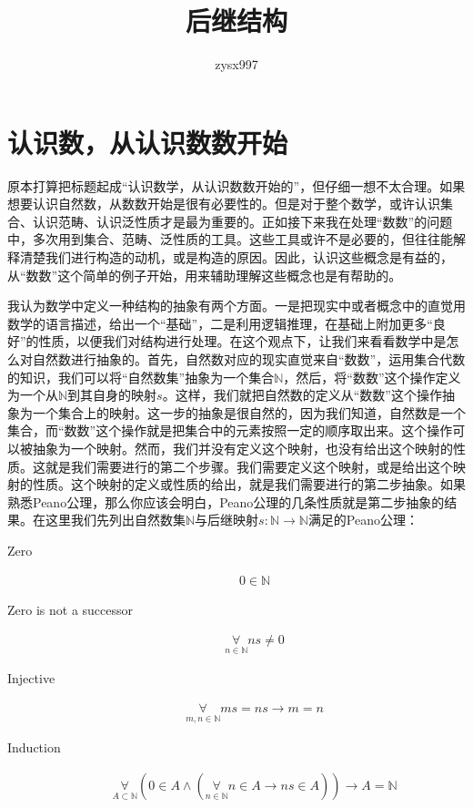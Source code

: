 \documentclass[oneside, 12pt]{ctexart}
\author{zysx997}
\title{后继结构}
\begin{document}
\maketitle

\section{认识数，从认识数数开始}

原本打算把标题起成“认识数学，从认识数数开始的”，但仔细一想不太合理。如果想要认识自然数，从数数开始是很有必要性的。但是对于整个数学，或许认识集合、认识范畴、认识泛性质才是最为重要的。正如接下来我在处理“数数”的问题中，多次用到集合、范畴、泛性质的工具。这些工具或许不是必要的，但往往能解释清楚我们进行构造的动机，或是构造的原因。因此，认识这些概念是有益的，从“数数”这个简单的例子开始，用来辅助理解这些概念也是有帮助的。

我认为数学中定义一种结构的抽象有两个方面。一是把现实中或者概念中的直觉用数学的语言描述，给出一个“基础”，二是利用逻辑推理，在基础上附加更多“良好”的性质，以便我们对结构进行处理。在这个观点下，让我们来看看数学中是怎么对自然数进行抽象的。首先，自然数对应的现实直觉来自“数数”，运用集合代数的知识，我们可以将“自然数集”抽象为一个集合$\mathbb{N}$，然后，将“数数”这个操作定义为一个从$\mathbb{N}$到其自身的映射$s$。这样，我们就把自然数的定义从“数数”这个操作抽象为一个集合上的映射。这一步的抽象是很自然的，因为我们知道，自然数是一个集合，而“数数”这个操作就是把集合中的元素按照一定的顺序取出来。这个操作可以被抽象为一个映射。然而，我们并没有定义这个映射，也没有给出这个映射的性质。这就是我们需要进行的第二个步骤。我们需要定义这个映射，或是给出这个映射的性质。这个映射的定义或性质的给出，就是我们需要进行的第二步抽象。如果熟悉Peano公理，那么你应该会明白，Peano公理的几条性质就是第二步抽象的结果。在这里我们先列出自然数集$\mathbb{N}$与后继映射$s \colon \mathbb{N} \to \mathbb{N}$满足的Peano公理：

\begin{description}
	\item[Zero]
		\begin{gather*}
			0 \in \mathbb{N}
		\end{gather*}
	\item[Zero is not a successor]
		\begin{gather*}
			\mathop{\forall}\limits_{n \in \mathbb{N}} ns \not= 0
		\end{gather*}
	\item[Injective]
		\begin{gather*}
			\mathop{\forall}\limits_{m,n \in \mathbb{N}} ms = ns \rightarrow m = n
		\end{gather*}
	\item[Induction]
		\begin{gather*}
			\mathop{\forall}\limits_{A \subset \mathbb{N}} (0 \in A \wedge (\mathop{\forall}\limits_{n \in \mathbb{N}} n \in A \rightarrow ns \in A)) \rightarrow A = \mathbb{N}
		\end{gather*}
\end{description}
\end{document}
